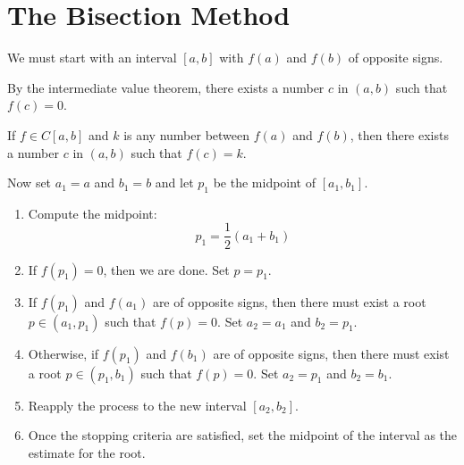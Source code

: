 %
%

\section{The Bisection Method}

We must start with an interval $[a, b]$ with 
$f(a)$ and $f(b)$ of opposite signs.

By the intermediate value theorem, there exists a number $c$ in $(a, b)$ such that
$f(c)=0$.

\thm If $f\in C[a,b]$ and $k$ is any number between $f(a)$ and $f(b)$, then
there exists a number $c$ in $(a, b)$ such that $f(c)=k$.

Now set $a_1 = a$ and $b_1 = b$ and let $p_1$ be the midpoint of $[a_1, b_1]$.

\begin{enumerate}
    \item Compute the midpoint:
    \begin{equation*}
        p_1 = \frac{1}{2} (a_1 + b_1)
    \end{equation*}
    
    \item If $f(p_1) = 0$, then we are done. Set $p = p_1$.
    
    \item If $f(p_1)$ and $f(a_1)$ are of opposite signs, then there must exist 
          a root $p \in (a_1, p_1)$ such that $f(p) = 0$. Set $a_2 = a_1$ and 
          $b_2 = p_1$.
    
    \item Otherwise, if $f(p_1)$ and $f(b_1)$ are of opposite signs, then there 
          must exist a root $p \in (p_1, b_1)$ such that $f(p) = 0$. Set 
          $a_2 = p_1$ and $b_2 = b_1$.
    
    \item Reapply the process to the new interval $[a_2, b_2]$.
    
    \item Once the stopping criteria are satisfied, set the midpoint of the 
          interval as the estimate for the root.
\end{enumerate}


